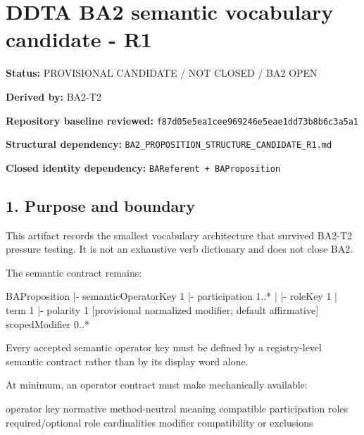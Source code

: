 \documentclass[
  10pt,
  letterpaper,
]{article}
\author{}
\date{}
\newenvironment{Shaded}{}{}
\newcommand{\NormalTok}[1]{#1}
\begin{document}
\section{DDTA BA2 semantic vocabulary candidate -
R1}\label{ddta-ba2-semantic-vocabulary-candidate---r1}

\textbf{Status:} PROVISIONAL CANDIDATE / NOT CLOSED / BA2 OPEN

\textbf{Derived by:} BA2-T2

\textbf{Repository baseline reviewed:}
\texttt{f87d05e5ea1cee969246e5eae1dd73b8b6c3a5a1}

\textbf{Structural dependency:}
\texttt{BA2\_PROPOSITION\_STRUCTURE\_CANDIDATE\_R1.md}

\textbf{Closed identity dependency:}
\texttt{BAReferent\ +\ BAProposition}

\subsection{1. Purpose and boundary}\label{purpose-and-boundary}

This artifact records the smallest vocabulary architecture that survived
BA2-T2 pressure testing. It is not an exhaustive verb dictionary and
does not close BA2.

The semantic contract remains:

\begin{Shaded}
\begin{Highlighting}[]
\NormalTok{BAProposition}
\NormalTok{|{-} semanticOperatorKey              1}
\NormalTok{|{-} participation                    1..*}
\NormalTok{|    |{-} roleKey                     1}
\NormalTok{|    \textasciigrave{}{-} term                        1}
\NormalTok{|{-} polarity                         1  [provisional normalized modifier; default affirmative]}
\NormalTok{\textasciigrave{}{-} scopedModifier                   0..*}
\end{Highlighting}
\end{Shaded}

Every accepted semantic operator key must be defined by a registry-level
semantic contract rather than by its display word alone.

At minimum, an operator contract must make mechanically available:

\begin{Shaded}
\begin{Highlighting}[]
\NormalTok{operator key}
\NormalTok{normative method{-}neutral meaning}
\NormalTok{compatible participation roles}
\NormalTok{required/optional role cardinalities}
\NormalTok{modifier compatibility or exclusions}
\end{Highlighting}
\end{Shaded}
\end{document}
